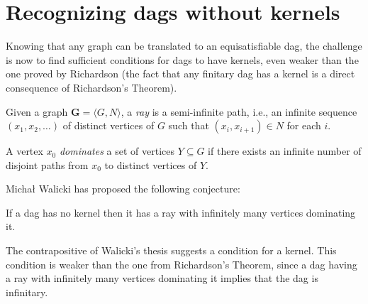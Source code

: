 
\section{Recognizing dags without kernels}
\label{sec:Recognizing dags without kernels}
Knowing that any graph can be translated to an equisatisfiable dag, the challenge is now to find sufficient conditions for dags to have kernels, even weaker than the one proved by Richardson (the fact that any finitary dag has a kernel is a direct consequence of Richardson's Theorem).
\begin{definition}
  Given a graph $\mathbf{G} = \langle G,N \rangle$, a \textit{ray} is a semi-infinite path, i.e., an infinite sequence $(x_1, x_2, \dots)$ of distinct vertices of $G$ such that $(x_i,x_{i+1}) \in N$ for each $i$.
\end{definition}
\begin{definition}
  A vertex $x_0$ \textit{dominates} a set of vertices $Y \subseteq G$ if there exists an infinite number of disjoint paths from $x_0$ to distinct vertices of $Y$.
\end{definition}
Michał Walicki has proposed the following conjecture:
\begin{conjecture}
  If a dag has no kernel then it has a ray with infinitely many vertices dominating it.
  \label{thm:ray_conjecture}
\end{conjecture}
The contrapositive of Walicki's thesis suggests a condition for a kernel.
This condition is weaker than the one from Richardson's Theorem, since a dag having a ray with infinitely many vertices dominating it implies that the dag is infinitary.
